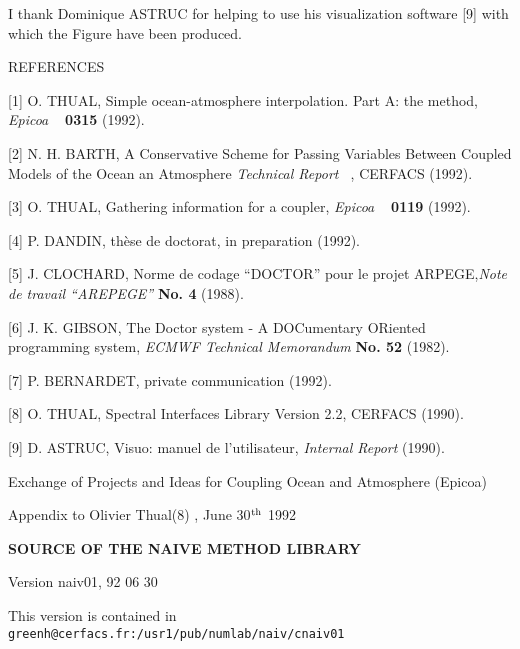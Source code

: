 I thank Dominique ASTRUC for helping to use his visualization software [9]
with which the Figure have been produced. 




\beginsection REFERENCES


\def\ref{\parskip 12pt \leftskip 20pt \parindent -20pt} 
\def\endref{\parskip 0pt \leftskip 0pt \parindent 20pt}


\ref

[1]
O. THUAL, Simple  ocean-atmosphere  interpolation. Part A: the method, 
 {\it Epicoa \ } {\bf 0315}  (1992).



[2] 
N. H. BARTH,  A Conservative Scheme for Passing Variables Between
Coupled Models of the Ocean an Atmosphere
 {\it Technical Report \ }, CERFACS (1992).



[3] 
O. THUAL, Gathering information for a coupler,
 {\it Epicoa \ } {\bf 0119} (1992).




[4] 
P. DANDIN, th\`ese de doctorat, in preparation (1992). 



[5] J. CLOCHARD, Norme de codage ``DOCTOR'' pour le projet ARPEGE,{\it Note de
travail ``AREPEGE''}  {\bf No. 4} (1988). 



[6] J. K. GIBSON, The Doctor system - A DOCumentary ORiented programming
system, {\it ECMWF Technical Memorandum}  {\bf No. 52} (1982). 


[7] P. BERNARDET, private communication (1992).

[8]  O. THUAL, Spectral Interfaces Library Version 2.2,  CERFACS (1990).


[9]  D. ASTRUC,  Visuo: manuel de l'utilisateur, {\it Internal Report}
(1990). 
 
\endref


\vfill\eject
\centerline{ Exchange of Projects and Ideas for Coupling Ocean and
Atmosphere (Epicoa)}
\centerline{ Appendix to Olivier Thual(8) , June 30$^{\rm th}$ 1992}
 \bigskip


\centerline{\bf  SOURCE OF THE NAIVE METHOD LIBRARY}
 \bigskip

\centerline{ Version naiv01,  92 06 30 } 



\bigskip \bigskip

This version is contained in {\tt
greenh@cerfacs.fr:/usr1/pub/numlab/naiv/cnaiv01}

